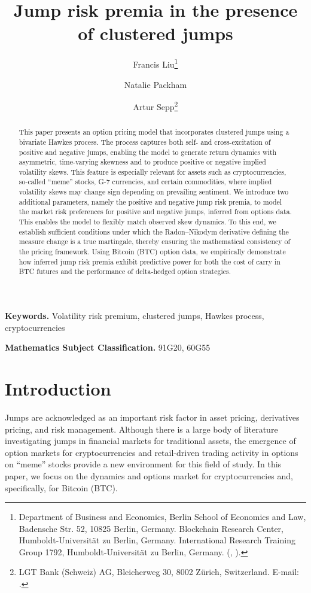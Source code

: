 \documentclass[11pt,a4paper]{article}
\title{Jump risk premia in the presence of clustered jumps}
\author{
    Francis Liu\thanks{Department of Business and Economics, Berlin School of Economics and Law, Badensche Str. 52, 10825 Berlin, Germany.
      Blockchain Research Center, Humboldt-Universit\"at zu Berlin, Germany.
      International Research Training Group 1792, Humboldt-Universität zu Berlin, Germany.  (\email{francisliutfp@gmail.com}, \email{packham@hwr-berlin.de}).}
  \and  Natalie Packham\footnotemark[1]
\and Artur Sepp\thanks{LGT Bank (Schweiz) AG,  Bleicherweg 30, 8002 Zürich, Switzerland.
 E-mail: \email{artursepp@gmail.com}.}
}
\date{}
\numberwithin{equation}{section}
\theoremstyle{remark}
\theoremstyle{definition}
\begin{document}
\maketitle

\begin{abstract}
This paper presents an option pricing model that incorporates clustered jumps using a bivariate Hawkes process. The process captures both self- and cross-excitation of positive and negative jumps, enabling the model to generate return dynamics with asymmetric, time-varying skewness and to produce positive or negative implied volatility skews. This feature is especially relevant for assets such as cryptocurrencies, so-called ``meme'' stocks, G-7 currencies, and certain commodities, where implied volatility skews may change sign depending on prevailing sentiment.
We introduce two additional parameters, namely the positive and negative jump risk premia, to model the market risk preferences for positive and negative jumps, inferred from options data. This enables the model to flexibly match observed skew dynamics. To this end, we establish sufficient conditions under which the Radon–Nikodym derivative defining the measure change is a true martingale, thereby ensuring the mathematical consistency of the pricing framework. Using Bitcoin (BTC) option data, we empirically demonstrate how inferred jump risk premia exhibit predictive power for both the cost of carry in BTC futures and the performance of delta-hedged option strategies.
\end{abstract}

\noindent\textbf{Keywords.}
Volatility risk premium, clustered jumps, Hawkes process, cryptocurrencies

\noindent\textbf{Mathematics Subject Classification.}
91G20, 60G55

\section{Introduction}\label{sec:introduction}
Jumps are acknowledged as an important risk factor in asset pricing, derivatives pricing, and risk management. Although there is a large body of literature investigating jumps in financial markets for traditional assets, the emergence of option markets for cryptocurrencies and retail-driven trading activity in options on ``meme'' stocks provide a new environment for this field of study. In this paper, we focus on the dynamics and options market for cryptocurrencies and, specifically, for Bitcoin (BTC).
\end{document}
